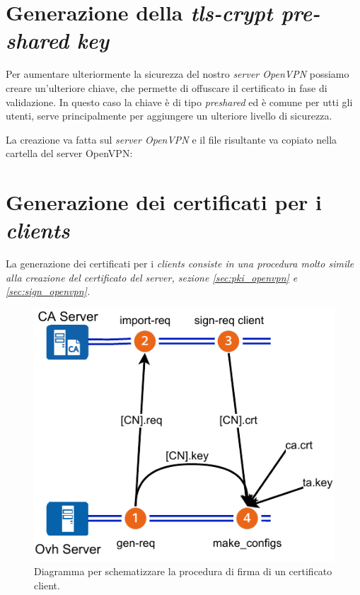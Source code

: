 \section{Generazione della \textit{tls-crypt pre-shared key}}
\label{sec:tls-crypt}

Per aumentare ulteriormente la sicurezza del nostro \textit{server OpenVPN} possiamo creare un'ulteriore chiave, che permette di offuscare il certificato in fase di validazione. In questo caso la chiave è di tipo \textit{preshared} ed è comune per utti gli utenti, serve principalmente per aggiungere un ulteriore livello di sicurezza.

La creazione va fatta sul \textit{server OpenVPN} e il file risultante va copiato nella cartella del server OpenVPN:



\section{Generazione dei certificati per i \textit{clients}}
\label{sec:client_keys}

La generazione dei certificati per i \it{clients} consiste in una procedura molto simile alla creazione del certificato del server, sezione \ref{sec:pki_openvpn} e \ref{sec:sign_openvpn}.

\begin{figure}[H]
    \centering
    \includegraphics[width=0.6\linewidth]{immagini/diag-firma_certificato_client}
    \caption{Diagramma per schematizzare la procedura di firma di un certificato client.}
    \label{fig:diag-firma_certificato_client}
\end{figure}

